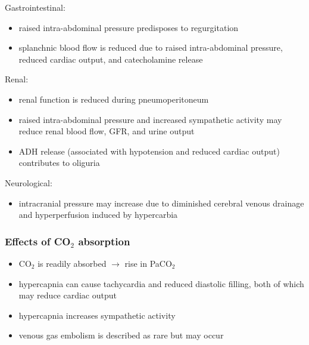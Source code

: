 \documentclass[11pt,a4paper]{article}
\begin{document}
Gastrointestinal:
\begin{itemize}
\item raised intra-abdominal pressure predisposes to regurgitation
\item splanchnic blood flow is reduced due to raised intra-abdominal pressure, reduced cardiac output, and catecholamine release
\end{itemize}

Renal:
\begin{itemize}
\item renal function is reduced during pneumoperitoneum
\item raised intra-abdominal pressure and increased sympathetic activity may reduce renal blood flow, GFR, and urine output
\item ADH release (associated with hypotension and reduced cardiac output) contributes to oliguria
\end{itemize}

Neurological:
\begin{itemize}
\item intracranial pressure may increase due to diminished cerebral venous drainage and hyperperfusion induced by hypercarbia
\end{itemize}

\subsubsection{Effects of CO$_2$ absorption}
\begin{itemize}
\item CO$_2$ is readily absorbed $\rightarrow$ rise in PaCO$_2$
\item hypercapnia can cause tachycardia and reduced diastolic filling, both of which may reduce cardiac output
\item hypercapnia increases sympathetic activity
\item venous gas embolism is described as rare but may occur
\end{itemize}
\end{document}
